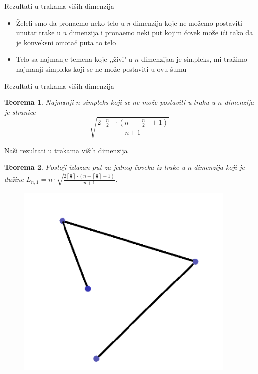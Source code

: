 \documentclass[12pt]{beamer}
\newtheorem{thm}{Teorema}[section]
\theoremstyle{definition}
\theoremstyle{remark}
\theoremstyle{plain}
\begin{document}
\begin{frame}{Rezultati u trakama vi\v sih dimenzija}
\begin{itemize}
\item \v Zeleli smo da prona\dj emo neko telo u $n$ dimenzija koje ne mo\v zemo postaviti unutar trake u $n$ dimenzija i prona\dj emo neki put kojim \v covek mo\v ze i\' ci tako da je konveksni omota\v c puta to telo
\pause
\item Telo sa najmanje temena koje ,,\v zivi" u $n$ dimenzijaa je simpleks, mi tra\v zimo najmanji simpleks koji se ne mo\v ze postaviti u ovu \v sumu
\end{itemize}
\end{frame}

\begin{frame}{Rezultati u trakama vi\v sih dimenzija}
\begin{thm}
 Najmanji $n$-simpleks koji se ne mo\v ze postaviti u traku u $n$ dimenzija  je stranice $$\sqrt{\frac{2\left\lceil \frac{n}{2}\right\rceil\cdot \left( n-\left\lceil\frac{n}{2}\right\rceil+1\right)}{n+1}}$$
\end{thm}
\end{frame}

\begin{frame}{Na\v si rezultati u trakama vi\v sih dimenzija}
\begin{thm}
Postoji izlazan put za jednog \v coveka iz trake u $n$ dimenzija koji je du\v zine $L_{n,1}=n\cdot \sqrt{\frac{2\left\lceil \frac{n}{2}\right\rceil\cdot \left( n-\left\lceil\frac{n}{2}\right\rceil+1\right)}{n+1}}$.
\end{thm}
\begin{figure}
\begin{center}
\includegraphics[width=300pt]{jedan.png}
\end{center}
\end{figure}
\end{frame}
\end{document}
